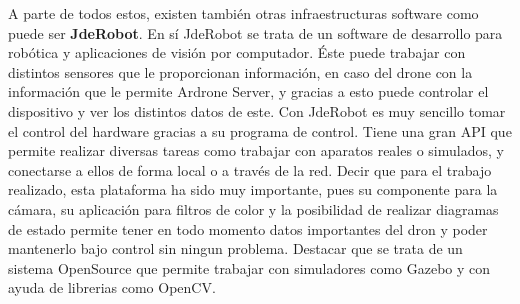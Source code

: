 \hspace{1 cm} A parte de todos estos, existen tambi\'en otras infraestructuras software como puede ser \textbf{JdeRobot}. En s\'i JdeRobot se trata de un software de desarrollo para rob\'otica y aplicaciones de visi\'on por computador. \'Este puede trabajar con distintos sensores que le proporcionan informaci\'on, en caso del drone con la informaci\'on que le permite Ardrone Server, y gracias a esto puede controlar el dispositivo y ver los distintos datos de este. Con JdeRobot es muy sencillo tomar el control del hardware gracias a su programa de control. Tiene una gran API que permite realizar diversas tareas como trabajar con aparatos reales o simulados, y conectarse a ellos de forma local o a trav\'es de la red. Decir que para el trabajo realizado, esta plataforma ha sido muy importante, pues su componente para la c\'amara, su aplicaci\'on para filtros de color y la posibilidad de realizar diagramas de estado permite tener en todo momento datos importantes del dron y poder mantenerlo bajo control sin ningun problema. Destacar que se trata de un sistema OpenSource que permite trabajar con simuladores como Gazebo y con ayuda de librerias como OpenCV. 
 
